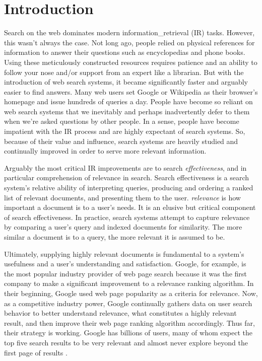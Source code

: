 \chapter{Introduction} \label{ch:[chapter 1 label]}

Search on the web dominates modern \gls{information_retrieval} (\acrfull{IR}) tasks. However, this wasn't always the case. Not long ago, people relied on physical references for information to answer their questions such as encyclopedias and phone books. Using these meticulously constructed resources requires patience and an ability to follow your nose and/or support from an expert like a librarian. But with the introduction of web search systems, it became significantly faster and arguably easier to find answers. Many web users set Google or Wikipedia as their browser’s homepage and issue hundreds of queries a day. People have become so reliant on web search systems that we inevitably and perhaps inadvertently defer to them when we’re asked questions by other people. In a sense, people have become impatient with the IR process and are highly expectant of search systems. So, because of their value and influence, search systems are heavily studied and continually improved in order to serve more relevant information.

Arguably the most critical IR improvements are to search \emph{effectiveness}, and in particular comprehension of relevance in search. Search effectiveness is a search system’s relative ability of interpreting queries, producing and ordering a ranked list of relevant \gls{document}s, and presenting them to the user. \emph{\gls{relevance}} is how important a document is to a user’s needs. It is an elusive but critical component of search effectiveness. In practice, search systems attempt to capture relevance by comparing a user’s query and indexed documents for similarity. The more similar a document is to a query, the more relevant it is assumed to be.

Ultimately, supplying highly relevant documents is fundamental to a system’s usefulness and a user’s understanding and satisfaction. Google, for example, is the most popular industry provider of web page search because it was the first company to make a significant improvement to a relevance ranking algorithm. In their beginning, Google used web page popularity as a criteria for relevance. Now, as a competitive industry power, Google continually gathers data on user search behavior to better understand relevance, what constitutes a highly relevant result, and then improve their web page ranking algorithm accordingly. Thus far, their strategy is working. Google has billions of users, many of whom expect the top five search results to be very relevant and almost never explore beyond the first page of results \cite{Manning2008}.


